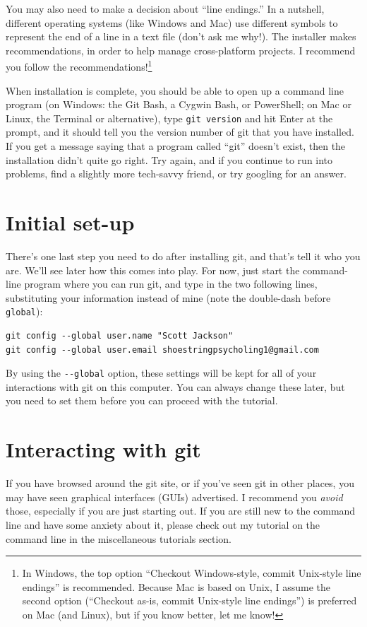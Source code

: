 \documentclass{article}
\begin{document}
You may also need to make a decision about ``line endings.'' In a nutshell, different operating systems (like Windows and Mac) use different symbols to represent the end of a line in a text file (don't ask me why!). The installer makes recommendations, in order to help manage cross-platform projects.  I recommend you follow the recommendations!\footnote{In Windows, the top option ``Checkout Windows-style, commit Unix-style line endings'' is recommended. Because Mac is based on Unix, I assume the second option (``Checkout as-is, commit Unix-style line endings'') is preferred on Mac (and Linux), but if you know better, let me know!
 }

When installation is complete, you should be able to open up a command line program (on Windows: the Git Bash, a Cygwin Bash, or PowerShell; on Mac or Linux, the Terminal or alternative), type \texttt{git version} and hit Enter at the prompt, and it should tell you the version number of git that you have installed. If you get a message saying that a program called ``git'' doesn't exist, then the installation didn't quite go right.  Try again, and if you continue to run into problems, find a slightly more tech-savvy friend, or try googling for an answer.
\section{Initial set-up}
\label{sec-3}

There's one last step you need to do after installing git, and that's tell it who you are.  We'll see later how this comes into play. For now, just start the command-line program where you can run git, and type in the two following lines, substituting your information instead of mine (note the double-dash before \texttt{global}):


\begin{verbatim}
git config --global user.name "Scott Jackson"
git config --global user.email shoestringpsycholing1@gmail.com
\end{verbatim}

By using the \texttt{-{}-global} option, these settings will be kept for all of your interactions with git on this computer. You can always change these later, but you need to set them before you can proceed with the tutorial.
\section{Interacting with git}
\label{sec-4}

If you have browsed around the git site, or if you've seen git in other places, you may have seen graphical interfaces (GUIs) advertised.  I recommend you \emph{avoid} those, especially if you are just starting out. If you are still new to the command line and have some anxiety about it, please check out my tutorial on the command line in the miscellaneous tutorials section.
\end{document}
